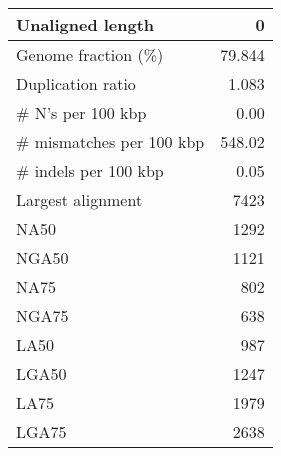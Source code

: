\documentclass[12pt,a4paper]{article}
\begin{document}
\begin{table}[ht]
\begin{center}
\begin{tabular}{|l*{1}{|r}|}
Unaligned length & 0 \\ \hline
Genome fraction (\%) & 79.844 \\ \hline
Duplication ratio & 1.083 \\ \hline
\# N's per 100 kbp & 0.00 \\ \hline
\# mismatches per 100 kbp & 548.02 \\ \hline
\# indels per 100 kbp & 0.05 \\ \hline
Largest alignment & 7423 \\ \hline
NA50 & 1292 \\ \hline
NGA50 & 1121 \\ \hline
NA75 & 802 \\ \hline
NGA75 & 638 \\ \hline
LA50 & 987 \\ \hline
LGA50 & 1247 \\ \hline
LA75 & 1979 \\ \hline
LGA75 & 2638 \\ \hline
\end{tabular}
\end{center}
\end{table}
\end{document}
